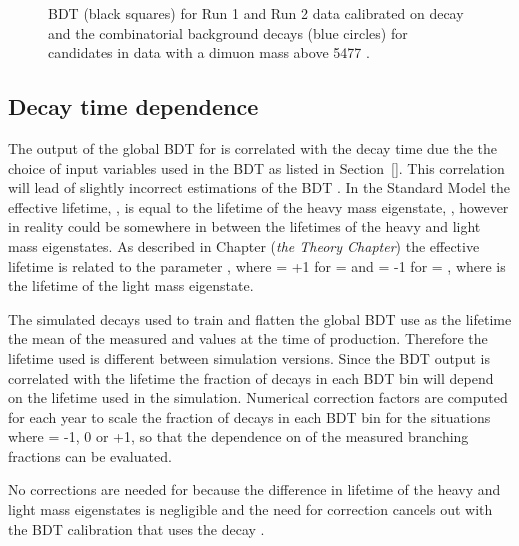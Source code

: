{\begin{figure}[htbp]
\begin{subfigure}[b]{0.48\textwidth}
   \end{subfigure}
    \caption{\bmumu BDT \pdfs (black squares) for Run 1 and Run 2 data calibrated on \bdkpi decay and the combinatorial background decays (blue circles) for \bmumu candidates in data with a dimuon mass above 5477 \mevcc. }
    \label{fig:BDTpdfs}
\end{figure}


\subsection{Decay time dependence}%
\label{sec:ADGBDTcorrections}
The output of the global BDT for \bmumu is correlated with the \bmumu decay time due the the choice of input variables used in the BDT as listed in Section~\ref{}. This correlation will lead of slightly incorrect estimations of the \bsmumu BDT \pdf. In the Standard Model the \bsmumu effective lifetime, \tmumu, is equal to the lifetime of the heavy \bs mass eigenstate, \tH, however in reality \tmumu could be somewhere in between the lifetimes of the heavy and light mass eigenstates. As described in Chapter ({\it the Theory Chapter}) the \bsmumu effective lifetime is related to the parameter \ADG, where \ADG = +1 for \tmumu = \tH and \ADG = -1 for \tmumu = \tL, where \tL is the lifetime of the light \bsmumu mass eigenstate.

The simulated decays used to train and flatten the global BDT use as the \bsmumu lifetime the mean of the measured \tH and \tL values at the time of production. Therefore the lifetime used is different between simulation versions. Since the BDT output is correlated with the lifetime the fraction of \bsmumu decays in each BDT bin will depend on the lifetime used in the simulation. Numerical correction factors are computed for each year to scale the fraction of \bsmumu decays in each BDT bin for the situations where \ADF = -1, 0 or +1, so that the dependence on \ADG of the measured branching fractions can be evaluated.

No corrections are needed for \bdmumu because the difference in lifetime of the heavy and light \bd mass eigenstates is negligible and the need for correction cancels out with the BDT calibration that uses the \bd decay \bdkpi. 


}
